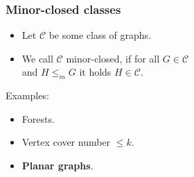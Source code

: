 \documentclass[t,usenames,dvipsnames]{beamer}
\begin{document}
\begin{frame} \frametitle{Minor-closed classes}
	\begin{itemize}[<+->]
		\item Let $\mathcal{C}$ be some class of graphs.
		\item We call $\mathcal{C}$ minor-closed, if for all $G \in
			\mathcal{C}$\\
			\hspace{1cm}and $H\leq_m G$ it holds $H \in \mathcal{C}$.
			\\ \vspace{1cm}
	\end{itemize}
	\begin{minipage}{.49\linewidth}
	Examples:
	\begin{itemize}[<+->]
			\item Forests.
			\item Vertex cover number $\leq k$.
			\item \textbf{Planar graphs}.
		\end{itemize}
	\end{minipage}
	\begin{minipage}{.49\linewidth}
		\centering
	\end{minipage}
\end{frame}
\end{document}
